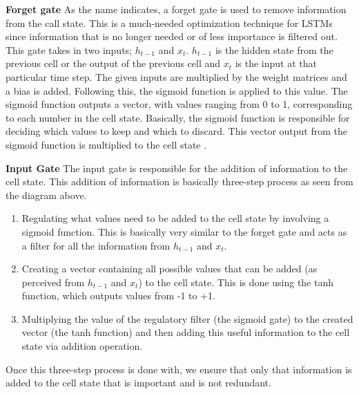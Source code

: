 \bigskip
\textbf{Forget gate}
As the name indicates, a forget gate is used to remove information from the call state. This is a much-needed optimization technique for LSTMs since information that is no longer needed or of less importance is filtered out.
This gate takes in two inputs; $h_{t-1}$ and $x_t$.
$h_{t-1}$ is the hidden state from the previous cell or the output of the previous cell and $x_t$ is the input at that particular time step. The given inputs are multiplied by the weight matrices and a bias is added. Following this, the sigmoid function is applied to this value. The sigmoid function outputs a vector, with values ranging from 0 to 1, corresponding to each number in the cell state. Basically, the sigmoid function is responsible for deciding which values to keep and which to discard. This vector output from the sigmoid function is multiplied to the cell state \cite{lewis2016deep}.

\bigskip
\textbf{Input Gate}
The input gate is responsible for the addition of information to the cell state. This addition of information is basically three-step process as seen from the diagram above.
\begin{enumerate}
    \item Regulating what values need to be added to the cell state by involving a sigmoid function. This is basically very similar to the forget gate and acts as a filter for all the information from $h_{t-1}$ and $x_{t}$.
    \item Creating a vector containing all possible values that can be added (as perceived from $h_{t-1}$ and $x_{t}$) to the cell state. This is done using the tanh function, which outputs values from -1 to +1.  
    \item Multiplying the value of the regulatory filter (the sigmoid gate) to the created vector (the tanh function) and then adding this useful information to the cell state via addition operation.
\end{enumerate}
Once this three-step process is done with, we ensure that only that information is added to the cell state that is important and is not redundant.


